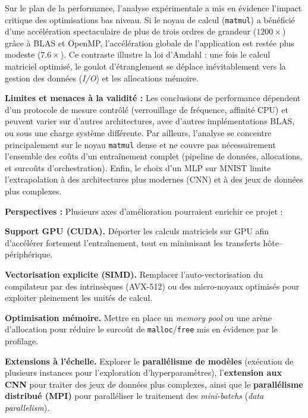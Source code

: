 \documentclass[a4paper,11pt]{article}
\begin{document}
Sur le plan de la performance, l'analyse expérimentale a mis en évidence l'impact critique des optimisations bas niveau. Si le noyau de calcul (\texttt{matmul}) a bénéficié d'une accélération spectaculaire de plus de trois ordres de grandeur ($1200\times$) grâce à BLAS et OpenMP, l'accélération globale de l'application est restée plus modeste ($7.6\times$). Ce contraste illustre la loi d'Amdahl : une fois le calcul matriciel optimisé, le goulot d'étranglement se déplace inévitablement vers la gestion des données (\textit{I/O}) et les allocations mémoire.

\textbf{Limites et menaces à la validité :}
Les conclusions de performance dépendent d'un protocole de mesure contrôlé (verrouillage de fréquence, affinité CPU) et peuvent varier sur d'autres architectures, avec d'autres implémentations BLAS, ou sous une charge système différente. Par ailleurs, l'analyse se concentre principalement sur le noyau \texttt{matmul} dense et ne couvre pas nécessairement l'ensemble des coûts d'un entraînement complet (pipeline de données, allocations, et surcoûts d'orchestration). Enfin, le choix d'un MLP sur MNIST limite l'extrapolation à des architectures plus modernes (CNN) et à des jeux de données plus complexes.

\textbf{Perspectives :}
Plusieurs axes d'amélioration pourraient enrichir ce projet :
\par\smallskip
\noindent\textbf{Support GPU (CUDA).} Déporter les calculs matriciels sur GPU afin d'accélérer fortement l'entraînement, tout en minimisant les transferts hôte–périphérique.
\par\smallskip
\noindent\textbf{Vectorisation explicite (SIMD).} Remplacer l'auto-vectorisation du compilateur par des intrinsèques (AVX-512) ou des micro-noyaux optimisés pour exploiter pleinement les unités de calcul.
\par\smallskip
\noindent\textbf{Optimisation mémoire.} Mettre en place un \textit{memory pool} ou une arène d'allocation pour réduire le surcoût de \texttt{malloc}/\texttt{free} mis en évidence par le profilage.
\par\smallskip
\noindent\textbf{Extensions à l'échelle.} Explorer le \textbf{parallélisme de modèles} (exécution de plusieurs instances pour l'exploration d'hyperparamètres), l'\textbf{extension aux CNN} pour traiter des jeux de données plus complexes, ainsi que le \textbf{parallélisme distribué (MPI)} pour paralléliser le traitement des \textit{mini-batchs} (\textit{data parallelism}).

\clearpage
\end{document}
